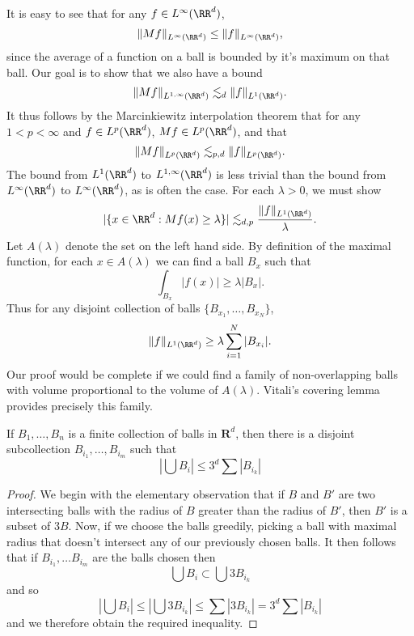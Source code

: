 It is easy to see that for any $f \in L^\infty(\RR^d)$,
%
\[ \| Mf \|_{L^\infty(\RR^d)} \leq \| f \|_{L^\infty(\RR^d)}, \]
%
since the average of a function on a ball is bounded by it's maximum on that ball. Our goal is to show that we also have a bound
%
\[ \| Mf \|_{L^{1,\infty}(\RR^d)} \lesssim_d \| f \|_{L^1(\RR^d)}. \]
%
It thus follows by the Marcinkiewitz interpolation theorem that for any $1 < p < \infty$ and $f \in L^p(\RR^d)$, $Mf \in L^p(\RR^d)$, and that
%
\[ \| Mf \|_{L^p(\RR^d)} \lesssim_{p,d} \| f \|_{L^p(\RR^d)}. \]
%
The bound from $L^1(\RR^d)$ to $L^{1,\infty}(\RR^d)$ is less trivial than the bound from $L^\infty(\RR^d)$ to $L^\infty(\RR^d)$, as is often the case. For each $\lambda > 0$, we must show
%
\[ |\{ x \in \RR^d : Mf(x) \geq \lambda \}| \lesssim_{d,p} \frac{\| f \|_{L^1(\RR^d)}}{\lambda}. \]
%
Let $A(\lambda)$ denote the set on the left hand side. By definition of the maximal function, for each $x \in A(\lambda)$ we can find a ball $B_x$ such that
%
\[ \int_{B_x} |f(x)| \geq \lambda |B_x|. \]
%
Thus for any disjoint collection of balls $\{ B_{x_1}, \dots, B_{x_N} \}$,
%
\[ \| f \|_{L^1(\RR^d)} \geq \lambda \sum_{i = 1}^N |B_{x_i}|. \]
%
Our proof would be complete if we could find a family of non-overlapping balls with volume proportional to the volume of $A(\lambda)$. Vitali's covering lemma provides precisely this family.

\begin{lemma}
    If $B_1, \dots, B_n$ is a finite collection of balls in $\mathbf{R}^d$, then there is a disjoint subcollection $B_{i_1}, \dots, B_{i_m}$ such that
    \[ \left| \bigcup B_i \right| \leq 3^d \sum |B_{i_k}| \]
\end{lemma}
\begin{proof}
    We begin with the elementary observation that if $B$ and $B'$ are two intersecting balls with the radius of $B$ greater than the radius of $B'$, then $B'$ is a subset of $3B$. Now, if we choose the balls greedily, picking a ball with maximal radius that doesn't intersect any of our previously chosen balls. It then follows that if $B_{i_1}, \dots B_{i_m}$ are the balls chosen then
    \[ \bigcup B_i \subset \bigcup 3B_{i_k} \]
    and so
    \[ \left| \bigcup B_i \right| \leq \left| \bigcup 3B_{i_k} \right| \leq \sum |3B_{i_k}| = 3^d \sum |B_{i_k}| \]
    and we therefore obtain the required inequality.
\end{proof}

